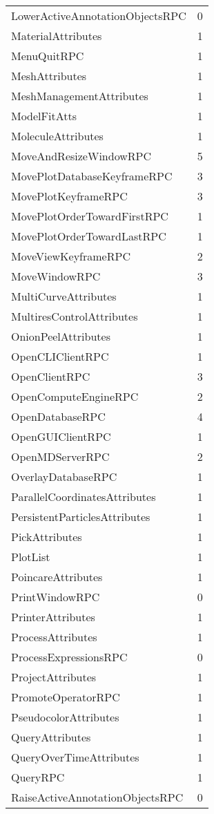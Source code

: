 \documentclass[10pt,a4paper]{report}
\begin{document}
\begin{longtable}{ll}
LowerActiveAnnotationObjectsRPC & 0 \\
MaterialAttributes & 1 \\
MenuQuitRPC & 1 \\
MeshAttributes & 1 \\
MeshManagementAttributes & 1 \\
ModelFitAtts & 1 \\
MoleculeAttributes & 1 \\
MoveAndResizeWindowRPC & 5 \\
MovePlotDatabaseKeyframeRPC & 3 \\
MovePlotKeyframeRPC & 3 \\
MovePlotOrderTowardFirstRPC & 1 \\
MovePlotOrderTowardLastRPC & 1 \\
MoveViewKeyframeRPC & 2 \\
MoveWindowRPC & 3 \\
MultiCurveAttributes & 1 \\
MultiresControlAttributes & 1 \\
OnionPeelAttributes & 1 \\
OpenCLIClientRPC & 1 \\
OpenClientRPC & 3 \\
OpenComputeEngineRPC & 2 \\
OpenDatabaseRPC & 4 \\
OpenGUIClientRPC & 1 \\
OpenMDServerRPC & 2 \\
OverlayDatabaseRPC & 1 \\
ParallelCoordinatesAttributes & 1 \\
PersistentParticlesAttributes & 1 \\
PickAttributes & 1 \\
PlotList & 1 \\
PoincareAttributes & 1 \\
PrintWindowRPC & 0 \\
PrinterAttributes & 1 \\
ProcessAttributes & 1 \\
ProcessExpressionsRPC & 0 \\
ProjectAttributes & 1 \\
PromoteOperatorRPC & 1 \\
PseudocolorAttributes & 1 \\
QueryAttributes & 1 \\
QueryOverTimeAttributes & 1 \\
QueryRPC & 1 \\
RaiseActiveAnnotationObjectsRPC & 0 \\

\end{longtable}
\end{document}
